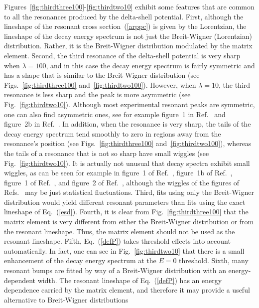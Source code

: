 \documentclass[12pt]{article}
\begin{document}
Figures~\ref{fig:thirdthree100}-\ref{fig:thirdtwo10} exhibit some features
that are common to all the resonances produced by the 
delta-shell potential. First, although the lineshape of the resonant cross 
section~(\ref{arppc}) is given by the Lorentzian, the lineshape of the
decay energy spectrum is not just the Breit-Wigner 
(Lorentzian) distribution. Rather, it is the Breit-Wigner distribution 
modulated by the matrix element. Second, the third resonance of the
delta-shell potential is very sharp when $\lambda =100$, and in this case 
the decay energy spectrum is fairly symmetric and has a shape that is
similar to the Breit-Wigner 
distribution (see Figs.~\ref{fig:thirdthree100} 
and~\ref{fig:thirdtwo100}). However, 
when $\lambda =10$, the third resonance is less sharp and the peak is 
more asymmetric (see Fig.~\ref{fig:thirdtwo10}). Although most experimental 
resonant peaks are symmetric, one can also find asymmetric ones, see 
for example figure~1 in Ref.~\cite{BESIII} and figure~2b in
Ref.~\cite{DETTORI}. In addition, when
the resonance is very sharp, the tails of the decay energy spectrum tend
smoothly to zero in regions away from the resonance's position 
(see Figs.~\ref{fig:thirdthree100} and~\ref{fig:thirdtwo100}), whereas 
the tails of a resonance that is not so sharp have small wiggles 
(see Fig.~\ref{fig:thirdtwo10}). It is actually not unusual that 
decay spectra exhibit small wiggles, as can be seen for example
in figure~1 of Ref.~\cite{LHCb1}, figure~1b of Ref.~\cite{LHCb2},
figure~1 of Ref.~\cite{LHCb3}, and figure~2 of Ref.~\cite{LHCb4}, although 
the wiggles of the figures of
Refs.~\cite{LHCb1,LHCb2,LHCb3,LHCb4} may be just statistical 
fluctuations. Third, fits using 
only the Breit-Wigner distribution would yield different
resonant parameters than fits using the exact lineshape of
Eq.~(\ref{esd}). Fourth, it is clear from 
Fig.~\ref{fig:thirdthree100} that the matrix element is very different 
from either the Breit-Wigner distribution or from the 
resonant lineshape. Thus, the matrix element should not be used as the
resonant lineshape. Fifth, Eq.~(\ref{defP}) takes 
threshold effects into account automatically. In fact, one can see
in Fig.~\ref{fig:thirdtwo10} that there is a small enhancement of the decay
energy spectrum at the $E=0$ threshold. Sixth, many resonant 
bumps are fitted by way of a
Breit-Wigner distribution with an energy-dependent width. The resonant 
lineshape of Eq.~(\ref{defP}) has an energy dependence carried by the 
matrix element, and 
therefore it may provide a useful alternative to Breit-Wigner distributions
\end{document}
